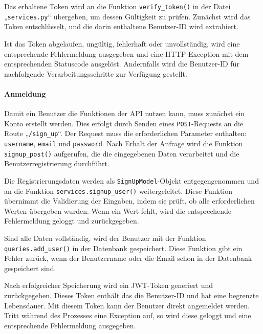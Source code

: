 \documentclass[12pt, letterpaper]{article}
\begin{document}
  \par Das erhaltene Token wird an die Funktion \texttt{verify\_token()} in der Datei „\texttt{services.py}“ übergeben, um dessen Gültigkeit zu prüfen. Zunächst wird das Token entschlüsselt, und die darin enthaltene Benutzer-ID wird extrahiert. 
  \par Ist das Token abgelaufen, ungültig, fehlerhaft oder unvollständig, wird eine entsprechende Fehlermeldung ausgegeben und eine HTTP-Exception mit dem entsprechenden Statuscode ausgelöst. Andernfalls wird die Benutzer-ID für nachfolgende Verarbeitungsschritte zur Verfügung gestellt.
  \paragraph{Anmeldung}
  \par \textbf{}
  \par Damit ein Benutzer die Funktionen der API nutzen kann, muss zunächst ein Konto erstellt werden. Dies erfolgt durch Senden eines \texttt{POST}-Requests an die Route „\texttt{/sign\_up}“. Der Request muss die erforderlichen Parameter enthalten: \texttt{username}, \texttt{email} und \texttt{password}. Nach Erhalt der Anfrage wird die Funktion \texttt{signup\_post()} aufgerufen, die die eingegebenen Daten verarbeitet und die Benutzerregistrierung durchführt.
  \par Die Registrierungsdaten werden als \texttt{SignUpModel}-Objekt entgegengenommen und an die Funktion \texttt{services.signup\_user()} weitergeleitet. Diese Funktion übernimmt die Validierung der Eingaben, indem sie prüft, ob alle erforderlichen Werten übergeben wurden. Wenn ein Wert fehlt, wird die entsprechende Fehlermeldung geloggt und zurückgegeben. 
  \par Sind alle Daten vollständig, wird der Benutzer mit der Funktion \texttt{queries.add\_user()} in der Datenbank gespeichert. Diese Funktion gibt ein Fehler zurück, wenn der Benutzername oder die Email schon in der Datenbank gespeichert sind.
  \par Nach erfolgreicher Speicherung wird ein JWT-Token generiert und zurückgegeben. Dieses Token enthält das die Benutzer-ID und hat eine begrenzte Lebensdauer. Mit diesem Token kann der Benutzer direkt angemeldet werden. Tritt während des Prozesses eine Exception auf, so wird diese geloggt und eine entsprechende Fehlermeldung ausgegeben.
\end{document}

